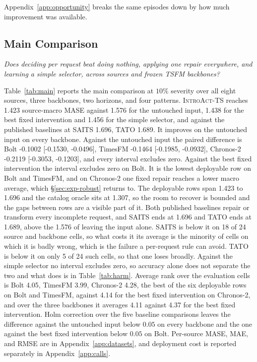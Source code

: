 \documentclass{article}
\newcommand{\introact}{\textsc{IntroAct-TS}}
\newcommand{\tsfm}{TSFM}
\begin{document}
Appendix~\ref{app:opportunity} breaks the same episodes down by how much improvement was
available.

\subsection{Main Comparison}
\label{sec:exp-main}
\emph{Does deciding per request beat doing nothing, applying one repair everywhere, and
learning a simple selector, across sources and frozen \tsfm{} backbones?}

Table~\ref{tab:main} reports the main comparison at $10\%$ severity over all eight sources,
three backbones, two horizons, and four patterns. \introact{} reaches 1.423 source-macro MASE against 1.576 for the untouched input, 1.438 for the best fixed intervention and 1.456 for the simple selector, and against the published baselines at SAITS 1.696, TATO 1.689. It improves on the untouched input on every backbone.
Against the untouched input the paired difference is Bolt -0.1002 [-0.1530, -0.0496], TimesFM -0.1464 [-0.1985, -0.0932], Chronos-2 -0.2119 [-0.3053, -0.1203], and every interval excludes zero. Against the best fixed intervention the interval excludes zero on Bolt. It is the lowest deployable row on Bolt and TimesFM, and on Chronos-2 one fixed repair reaches a lower macro average, which \S\ref{sec:exp-robust} returns to. The deployable rows span 1.423 to 1.696 and the catalog oracle sits at 1.307, so the room to recover is bounded and the gaps between rows are a visible part of it. Both published baselines repair or transform every incomplete request, and SAITS ends at 1.696 and TATO ends at 1.689, above the 1.576 of leaving the input alone. SAITS is below it on 18 of 24 source and backbone cells, so what costs it its average is the minority of cells on which it is badly wrong, which is the failure a per-request rule can avoid. TATO is below it on only 5 of 24 such cells, so that one loses broadly. Against the simple selector no interval excludes zero, so accuracy alone does not separate the two and what does is in Table~\ref{tab:harm}.
Average rank over the evaluation cells is Bolt 4.05, TimesFM 3.99, Chronos-2 4.28, the best of the six deployable rows on Bolt and TimesFM, against 4.14 for the best fixed intervention on Chronos-2, and over the three backbones it averages 4.11 against 4.37 for the best fixed intervention. Holm correction over the five baseline comparisons leaves the difference against the untouched input below $0.05$ on every backbone and the one against the best fixed intervention below $0.05$ on Bolt.
Per-source MASE, MAE, and RMSE are in Appendix~\ref{app:datasets}, and
deployment cost is reported separately in Appendix~\ref{app:calls}.
\end{document}
